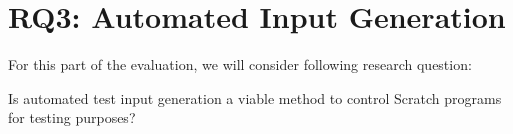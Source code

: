 
\section{RQ3: Automated Input Generation}


For this part of the evaluation, we will consider following research question:

\begin{center}\begin{minipage}{.9\textwidth}
Is automated test input generation a viable method to control Scratch programs for testing purposes?
\end{minipage}\end{center}

